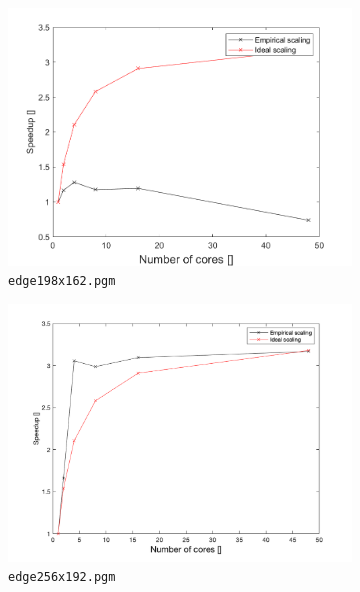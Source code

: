 \documentclass{article} %
\begin{document}
\begin{figure}
\begin{subfigure}[b]{.4\textwidth}
    \centering
    \includegraphics[width=\textwidth]{figures/speedup_198.png}
    \caption{\texttt{edge198x162.pgm}}
    \label{fig:speedup198}
\end{subfigure}
\hfill
\begin{subfigure}[b]{.4\textwidth}
    \centering
    \includegraphics[width=\textwidth]{figures/speedup_256.png}
    \caption{\texttt{edge256x192.pgm}}
    \label{fig:speedup256}
\end{subfigure}
\begin{subfigure}[b]{.4\textwidth}
    \centering

\end{subfigure}
\end{figure}
\end{document}

